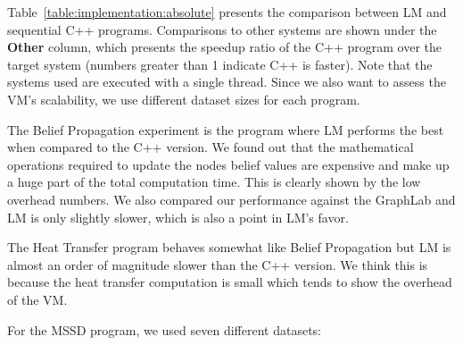 Table~\ref{table:implementation:absolute} presents the comparison between LM and
sequential C++ programs. Comparisons to other systems are shown under the
\textbf{Other} column, which presents the speedup ratio of the C++ program over
the target system (numbers greater than 1 indicate C++ is faster). Note that the
systems used are executed with a single thread. Since we also want to assess the
VM's scalability, we use different dataset sizes for each program.

\begin{table}[ht]
   \begin{center}
      
   \end{center}


   \label{table:implementation:absolute}
\end{table}

The Belief Propagation experiment is the program where LM performs the best when
compared to the C++ version. We found out that the mathematical operations
required to update the nodes belief values are expensive and make up a huge part
of the total computation time. This is clearly shown by the low overhead
numbers. We also compared our performance against the GraphLab and LM is only
slightly slower, which is also a point in LM's favor.

The Heat Transfer program behaves somewhat like Belief Propagation but LM is
almost an order of magnitude slower than the C++ version. We think this is
because the heat transfer computation is small which tends to show the overhead
of the VM.

For the MSSD program, we used seven different datasets:

